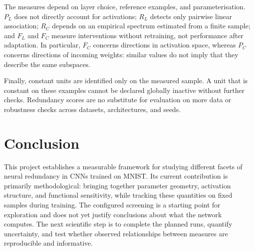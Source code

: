 \documentclass[11pt,a4paper]{article}
\begin{document}
The measures depend on layer choice, reference examples, and parameterisation. $P_L$ does not directly account for activations; $R_L$ detects only pairwise linear association; $R_C$ depends on an empirical spectrum estimated from a finite sample; and $F_L$ and $F_C$ measure interventions without retraining, not performance after adaptation. In particular, $F_C$ concerns directions in activation space, whereas $P_C$ concerns directions of incoming weights: similar values do not imply that they describe the same subspaces.

Finally, constant units are identified only on the measured sample. A unit that is constant on these examples cannot be declared globally inactive without further checks. Redundancy scores are no substitute for evaluation on more data or robustness checks across datasets, architectures, and seeds.

\section{Conclusion}

This project establishes a measurable framework for studying different facets of neural redundancy in CNNs trained on MNIST. Its current contribution is primarily methodological: bringing together parameter geometry, activation structure, and functional sensitivity, while tracking these quantities on fixed samples during training. The configured screening is a starting point for exploration and does not yet justify conclusions about what the network computes. The next scientific step is to complete the planned runs, quantify uncertainty, and test whether observed relationships between measures are reproducible and informative.



\end{document}
